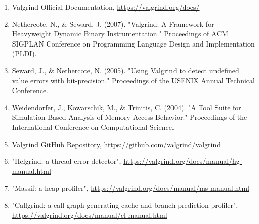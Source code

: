 \documentclass[11pt,a4paper]{article}
\begin{document}
\begin{enumerate}
    \item Valgrind Official Documentation, \url{https://valgrind.org/docs/}
    
    \item Nethercote, N., \& Seward, J. (2007). "Valgrind: A Framework for Heavyweight Dynamic Binary Instrumentation." Proceedings of ACM SIGPLAN Conference on Programming Language Design and Implementation (PLDI).
    
    \item Seward, J., \& Nethercote, N. (2005). "Using Valgrind to detect undefined value errors with bit-precision." Proceedings of the USENIX Annual Technical Conference.
    
    \item Weidendorfer, J., Kowarschik, M., \& Trinitis, C. (2004). "A Tool Suite for Simulation Based Analysis of Memory Access Behavior." Proceedings of the International Conference on Computational Science.
    
    \item Valgrind GitHub Repository, \url{https://github.com/valgrind/valgrind}
    
    \item "Helgrind: a thread error detector", \url{https://valgrind.org/docs/manual/hg-manual.html}
    
    \item "Massif: a heap profiler", \url{https://valgrind.org/docs/manual/ms-manual.html}
    
    \item "Callgrind: a call-graph generating cache and branch prediction profiler", \url{https://valgrind.org/docs/manual/cl-manual.html}
\end{enumerate}
\end{document}
